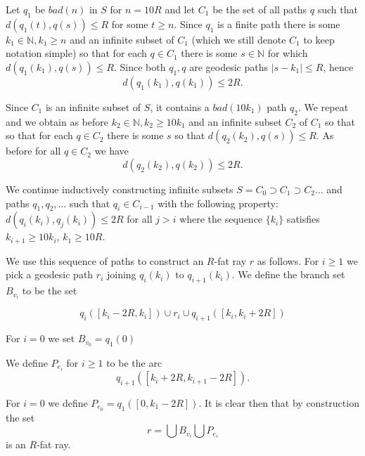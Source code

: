 \documentclass[a4paper]{article}
\newcommand{\comment}[1]{}
\newtheorem{lemma}[proposition]{Lemma}
\newcommand{\N}{\ensuremath{\mathbb N}}
\newcommand{\nin}{\ensuremath{{n\in\N}}}
\newcommand{\pth}[2]{\ensuremath{#1}\text{--}\ensuremath{#2}~path}
\newcommand{\G}{\ensuremath{G}}
\newcommand{\Lr}[1]{Lemma~\ref{#1}}
\newcommand{\Cnr}[1]{Con\-jecture~\ref{#1}}
\newcommand{\fe}{for every}
\newcommand{\Fe}{For every}
\newcommand{\st}{such that}
\begin{document}
{Let $q_1$ be $bad(n)$ in $S$ for $n=10R$ and let $C_1$ be the set of all paths $q$ such that $d(q_1(t),q(s))\leq R$ 
for some $t\geq n$. Since $q_1$ is a finite path there is some $k_1\in \mathbb N, k_1\geq n$ and an infinite
subset of $C_1$ (which we still denote $C_1$ to keep notation simple) so that for each $q\in C_1$
there is some $s\in \mathbb N$ for which
$d(q_1(k_1),q(s))\leq R$. Since both $q_1,q$ are geodesic paths $|s-k_1|\leq R$, hence
$$d(q_1(k_1),q(k_1))\leq 2R.$$

Since $C_1$ is an infinite subset of $S$, it contains a $bad(10k_1)$ path $q_2$. We repeat
and we obtain as before $k_2\in \mathbb N, k_2\geq 10k_1$ and an infinite subset $C_2$ of $C_1$ so that
so that for each $q\in C_2$ there is some $s$ so that
$d(q_2(k_2),q(s))\leq R$. As before for all $q\in C_2$ we have
$$d(q_2(k_2),q(k_2))\leq 2R.$$

We continue inductively constructing infinite subsets $S=C_0\supset C_1\supset C_2 \ldots$
and paths $q_1,q_2,\ldots$ such that $q_i\in C_{i-1}$  with the following property:
$d(q_i(k_i),q_j(k_i))\leq 2R$ for all $j>i$ where the sequence $\{k_i\}$ satisfies $k_{i+1}\geq 10k_i$, $k_1\geq 10R$.

We use this sequence of paths to construct an $R$-fat ray $r$ as follows. For $i\geq 1$ we pick a geodesic path $r_i$ joining $q_i(k_i)$ to $q_{i+1}(k_{i})$. We define the branch set $B_{v_i}$ to be the set 

$$q_i([k_i-2R,k_i])\cup r_i\cup q_{i+1}([k_{i},k_{i}+2R])$$

For $i=0$ we set $B_{v_0}=q_1(0)$

We define $P_{e_i}$ for $i\geq 1$ to be the arc
$$q_{i+1}([k_{i}+2R,k_{i+1}-2R]).$$

For $i=0$ we define $P_{e_0}=q_1([0,k_1-2R ])$.
It is clear then that by construction the set
$$r=\bigcup B_{v_i} \bigcup P_{e_i}$$ is an $R$-fat ray.
} 

\comment{
A potential approach towards \Cnr{Cnr Konig} is to take, \fe\ $K\in \N$, a $K$-net $G_n$ in $X$, and apply the following to $G_n$:
\begin{lemma} \label{lem}
Let $G$ be a (connected) graph of infinite diameter. Then $G$ contains the ray or $\bigvee P_n$ as a subgraph.
\end{lemma}
\begin{proof}
Pick a vertex $o\in V(G)$, and let $L_n,\nin$ be the set of vertices at distance exactly $n$ from $o$. \Fe\ $\nin$, pick a vertex $x_n\in L_n$, and a `downward' \pth{x_n}{o}\ $T_n$. By stopping $T_n$ upon reaching $\{T_j \mid j<n\}$ we can ensure that $\bigcup T_n$ is a (directed) tree $T\subseteq G$. We distinguish two cases. 

If $|L_n \cap T| <\infty$ holds \fe\ \nin, then K\"onig's lemma yields an infinite geodesic in \G. 

Otherwise, we can choose the smallest index  $n$ \st\ $|L_n \cap T| = \infty$. Then some $o'\in L_j, j< n$ sends infinitely many disjoint paths to $L_n$, and by extending these paths to higher $L_i$'s we obtain a copy of $\bigvee P_n$ in $T$.
\end{proof}

But I cannot yet use \Lr{lem} to prove \Cnr{Cnr Konig}.
}
\end{document}
